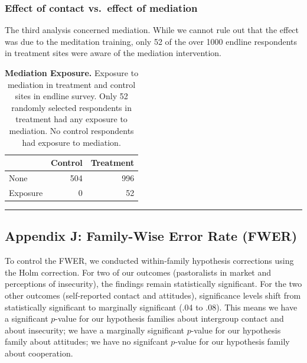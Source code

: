 \documentclass[
]{article}
\begin{document}
\hypertarget{effect-of-contact-vs.-effect-of-mediation}{%
\subsubsection{Effect of contact vs.~effect of
mediation}\label{effect-of-contact-vs.-effect-of-mediation}}

The third analysis concerned mediation. While we cannot rule out that
the effect was due to the meditation training, only 52 of the over 1000
endline respondents in treatment sites were aware of the mediation
intervention.

\begin{table}[H]
\begin{center}
\label{tab:mediat_tab}
\caption{\textbf{Mediation Exposure.} Exposure to mediation in treatment and control sites in endline survey. Only 52 randomly selected respondents in treatment had any exposure to mediation. No control respondents had exposure to mediation.}
\smallskip

\begin{tabular}{l|r|r}
\hline
  & Control & Treatment\\
\hline
None & 504 & 996\\
\hline
Exposure & 0 & 52\\
\hline
\end{tabular}


\end{center}
\end{table}

\begin{center}\rule{0.5\linewidth}{0.5pt}\end{center}

\hypertarget{appendix-j-family-wise-error-rate-fwer}{%
\subsection{Appendix J: Family-Wise Error Rate
(FWER)}\label{appendix-j-family-wise-error-rate-fwer}}

To control the FWER, we conducted within-family hypothesis corrections
using the Holm correction. For two of our outcomes (pastoralists in
market and perceptions of insecurity), the findings remain statistically
significant. For the two other outcomes (self-reported contact and
attitudes), significance levels shift from statistically significant to
marginally significant (.04 to .08). This means we have a significant
\(p\)-value for our hypothesis families about intergroup contact and
about insecurity; we have a marginally significant \(p\)-value for our
hypothesis family about attitudes; we have no signifcant \(p\)-value for
our hypothesis family about cooperation.
\end{document}
